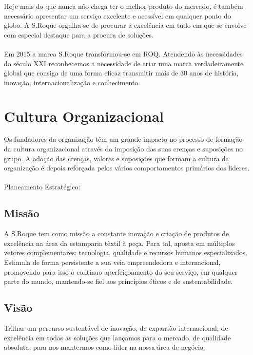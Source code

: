 Hoje mais do que nunca não chega ter o melhor produto do mercado, é também necessário apresentar um serviço excelente e acessível em qualquer ponto do globo. A S.Roque orgulha-se de procurar a excelência em tudo em que se envolve com especial destaque para a procura de soluções.\\
\\
Em 2015 a marca S.Roque transformou-se em ROQ. Atendendo às necessidades do século XXI reconhecemos a necessidade de criar uma marca verdadeiramente global que consiga de uma forma eficaz transmitir mais de 30 anos de história, inovação, internacionalização e conhecimento.
\newpage
\section{Cultura Organizacional}
\qquad Os fundadores da organização têm um grande impacto no processo de formação da cultura organizacional através da imposição das suas crenças e suposições no grupo. A adoção das crenças, valores e suposições que formam a cultura da organização é depois reforçada pelos vários comportamentos primários dos lideres.\\
\\
Planeamento Estratégico:
\subsection{Missão}
A S.Roque tem como missão a constante inovação e criação de produtos de excelência na área da estamparia têxtil à peça. Para tal, aposta em múltiplos vetores complementares: tecnologia, qualidade e recursos humanos especializados. Estimula de forma persistente a sua veia empreendedora e internacional, promovendo para isso o contínuo aperfeiçoamento do seu serviço, em qualquer parte do mundo, mantendo-se fiel aos princípios éticos e de sustentabilidade.
\subsection{Visão}
Trilhar um percurso sustentável de inovação, de expansão internacional, de excelência em todas as soluções que lançamos para o mercado, de qualidade absoluta, para nos mantermos como líder na nossa área de negócio.

